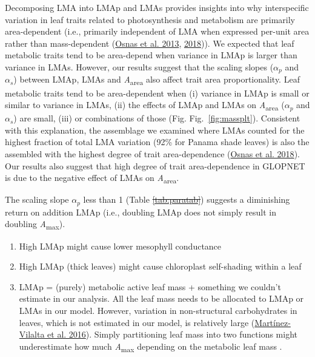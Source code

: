 \documentclass[
  12pt,
  a4paper,
,tablecaptionabove
]{scrartcl}
\providecommand{\tightlist}{%
  \setlength{\itemsep}{0pt}\setlength{\parskip}{0pt}}
\providecommand{\DIFaddtex}[1]{{\protect\color{blue}\uwave{#1}}} %
\providecommand{\DIFdeltex}[1]{{\protect\color{red}\sout{#1}}}                      %
\providecommand{\DIFaddbegin}{} %
\providecommand{\DIFaddend}{} %
\providecommand{\DIFdelbegin}{} %
\providecommand{\DIFdelend}{} %
\providecommand{\DIFadd}[1]{\texorpdfstring{\DIFaddtex{#1}}{#1}} %
\providecommand{\DIFdel}[1]{\texorpdfstring{\DIFdeltex{#1}}{}} %
\newcommand{\DIFscaledelfig}{0.5}
\newlength{\DIFdelgraphicswidth} %
\newlength{\DIFdelgraphicsheight} %
\newcommand{\DIFaddincludegraphics}[2][]{{\color{blue}\fbox{\DIFOincludegraphics[#1]{#2}}}} %
\newcommand{\DIFdelincludegraphics}[2][]{%
\sbox{\DIFdelgraphicsbox}{\DIFOincludegraphics[#1]{#2}}%
\settoboxwidth{\DIFdelgraphicswidth}{\DIFdelgraphicsbox} %
\settoboxtotalheight{\DIFdelgraphicsheight}{\DIFdelgraphicsbox} %
\scalebox{\DIFscaledelfig}{%
\parbox[b]{\DIFdelgraphicswidth}{\usebox{\DIFdelgraphicsbox}\\[-\baselineskip] \rule{\DIFdelgraphicswidth}{0em}}\llap{\resizebox{\DIFdelgraphicswidth}{\DIFdelgraphicsheight}{%
\setlength{\unitlength}{\DIFdelgraphicswidth}%
\begin{picture}(1,1)%
\thicklines\linethickness{2pt} %
{\color[rgb]{1,0,0}\put(0,0){\framebox(1,1){}}}%
{\color[rgb]{1,0,0}\put(0,0){\line( 1,1){1}}}%
{\color[rgb]{1,0,0}\put(0,1){\line(1,-1){1}}}%
\end{picture}%
}\hspace*{3pt}}} %
} %
\DeclareRobustCommand{\DIFaddbegin}{\DIFOaddbegin \let\includegraphics\DIFaddincludegraphics} %
\DeclareRobustCommand{\DIFaddend}{\DIFOaddend \let\includegraphics\DIFOincludegraphics} %
\DeclareRobustCommand{\DIFdelbegin}{\DIFOdelbegin \let\includegraphics\DIFdelincludegraphics} %
\DeclareRobustCommand{\DIFdelend}{\DIFOaddend \let\includegraphics\DIFOincludegraphics} %
\begin{document}
Decomposing LMA into LMAp and LMAs provides insights into why interspecific variation in leaf traits related to photosynthesis and metabolism are primarily area-dependent (i.e., primarily independent of LMA when expressed per-unit area rather than mass-dependent (\protect\hyperlink{ref-Osnas2013}{Osnas et al. 2013}, \protect\hyperlink{ref-Osnas2018}{2018})).
We expected that leaf metabolic traits tend to be area-depend when variance in LMAp is larger than variance in LMAs.
However, our results suggest that the scaling slopes (\(\alpha_p\) and \(\alpha_s\)) between LMAp, LMAs and \emph{A}\textsubscript{area} also affect trait area proportionality.
Leaf metabolic traits tend to be area-dependent when (i) variance in LMAp is small or similar to variance in LMAs, (ii) the effects of LMAp and LMAs on \emph{A}\textsubscript{area} (\(\alpha_p\) and \(\alpha_s\)) are small, (iii) or combinations of those (Fig. Fig.~\ref{fig:massplt}).
Consistent with this explanation, the assemblage we examined where LMAs counted for the highest fraction of total LMA variation (92\% for Panama shade leaves) is also the assembled with the highest degree of trait area-dependence (\protect\hyperlink{ref-Osnas2018}{Osnas et al. 2018}).
Our results also suggest that high degree of trait area-dependence in GLOPNET is due to the negative effect of LMAs on \emph{A}\textsubscript{area}.

The scaling slope \(\alpha_p\) less than 1 (Table \DIFdelbegin \DIFdel{\ref{tab:paratab}}\DIFdelend \DIFaddbegin \DIFadd{2}\DIFaddend ) suggests a diminishing return on addition LMAp (i.e., doubling LMAp does not simply result in doubling \emph{A}\textsubscript{max}).

\begin{enumerate}
\def\labelenumi{\arabic{enumi}.}
\tightlist
\item
  High LMAp might cause lower mesophyll conductance
\item
  High LMAp (thick leaves) might cause chloroplast self-shading within a leaf
\item
  LMAp = (purely) metabolic active leaf mass + something we couldn't estimate in our analysis. All the leaf mass needs to be allocated to LMAp or LMAs in our model. However, variation in non-structural carbohydrates in leaves, which is not estimated in our model, is relatively large (\protect\hyperlink{ref-Martinez-Vilalta2016}{Martínez-Vilalta et al. 2016}). Simply partitioning leaf mass into two functions might underestimate how much \emph{A}\textsubscript{max} depending on the metabolic leaf mass .
\end{enumerate}
\end{document}
